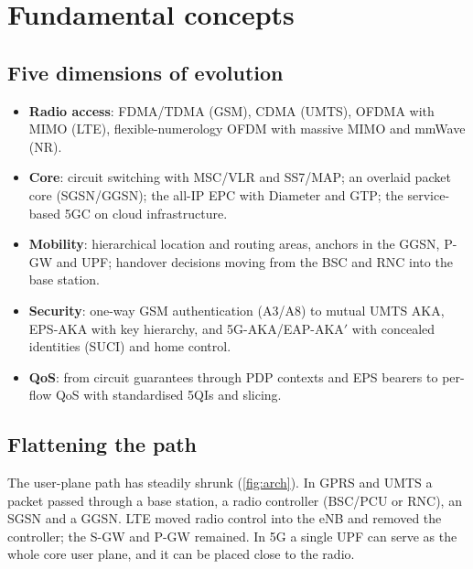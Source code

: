 \documentclass[11pt,a4paper]{article}
\begin{document}
\section{Fundamental concepts}

\subsection{Five dimensions of evolution}
\begin{itemize}
  \item \textbf{Radio access}: FDMA/TDMA (GSM), CDMA (UMTS), OFDMA with MIMO (LTE), flexible-numerology OFDM with massive MIMO and mmWave (NR).
  \item \textbf{Core}: circuit switching with MSC/VLR and SS7/MAP; an overlaid packet core (SGSN/GGSN); the all-IP EPC with Diameter and GTP;
        the service-based 5GC on cloud infrastructure.
  \item \textbf{Mobility}: hierarchical location and routing areas, anchors in the GGSN, P-GW and UPF; handover decisions moving from the BSC and RNC
        into the base station.
  \item \textbf{Security}: one-way GSM authentication (A3/A8) to mutual UMTS AKA, EPS-AKA with key hierarchy, and 5G-AKA/EAP-AKA$'$ with concealed
        identities (SUCI) and home control.
  \item \textbf{QoS}: from circuit guarantees through PDP contexts and EPS bearers to per-flow QoS with standardised 5QIs and slicing.
\end{itemize}

\subsection{Flattening the path}
The user-plane path has steadily shrunk (\cref{fig:arch}). In GPRS and UMTS a packet passed through a base station, a radio controller (BSC/PCU
or RNC), an SGSN and a GGSN. LTE moved radio control into the eNB and removed the controller; the S-GW and P-GW remained. In 5G a single UPF can
serve as the whole core user plane, and it can be placed close to the radio.

\begin{acnfigure}
  \caption{User-plane path of packet data from 2.5G to 5G (simplified).}
  \label{fig:arch}
\end{acnfigure}
\end{document}
